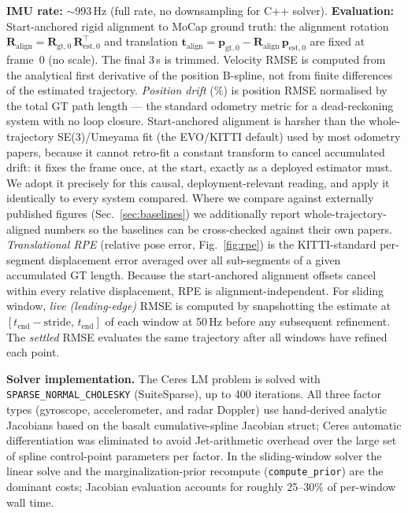 \documentclass[journal]{IEEEtran}
\begin{document}
\textbf{IMU rate:} $\sim$993\,Hz (full rate, no downsampling for C++ solver).
\textbf{Evaluation:} Start-anchored rigid alignment to MoCap ground
truth: the alignment rotation $\mathbf{R}_\mathrm{align} =
\mathbf{R}_{\mathrm{gt},0}\,\mathbf{R}_{\mathrm{est},0}^\top$
and translation $\mathbf{t}_\mathrm{align} =
\mathbf{p}_{\mathrm{gt},0} - \mathbf{R}_\mathrm{align}\,
\mathbf{p}_{\mathrm{est},0}$ are fixed at frame~0 (no scale).
The final 3\,s is trimmed.  Velocity RMSE is computed from the
analytical first derivative of the position B-spline, not from finite
differences of the estimated trajectory.
\emph{Position drift} (\%) is position RMSE normalised by the total
GT path length --- the standard odometry metric for a
dead-reckoning system with no loop closure.
Start-anchored alignment is harsher than the whole-trajectory
SE(3)/Umeyama fit (the EVO/KITTI default) used by most odometry papers,
because it cannot retro-fit a constant transform to cancel accumulated
drift: it fixes the frame once, at the start, exactly as a deployed
estimator must.  We adopt it precisely for this causal,
deployment-relevant reading, and apply it identically to every system
compared.  Where we compare against externally published figures
(Sec.~\ref{sec:baselines}) we additionally report whole-trajectory-aligned
numbers so the baselines can be cross-checked against their own papers.
\emph{Translational RPE} (relative pose error, Fig.~\ref{fig:rpe}) is
the KITTI-standard per-segment displacement error averaged over all
sub-segments of a given accumulated GT length.
Because the start-anchored alignment offsets cancel within every
relative displacement, RPE is alignment-independent.
For sliding window, \emph{live (leading-edge)} RMSE is computed by
snapshotting the estimate at $[t_\text{end}{-}\text{stride},\, t_\text{end}]$
of each window at 50\,Hz before any subsequent refinement.  The
\emph{settled} RMSE evaluates the same trajectory after all windows
have refined each point.

\textbf{Solver implementation.}
The Ceres LM problem is solved with \texttt{SPARSE\_NORMAL\_CHOLESKY}
(SuiteSparse), up to 400 iterations.
All three factor types (gyroscope, accelerometer, and radar Doppler)
use hand-derived analytic Jacobians based on the basalt
cumulative-spline Jacobian struct; Ceres automatic differentiation was
eliminated to avoid Jet-arithmetic overhead over the large set of
spline control-point parameters per factor.
In the sliding-window solver the linear solve and the
marginalization-prior recompute (\texttt{compute\_prior}) are the
dominant costs; Jacobian evaluation accounts for roughly 25--30\% of
per-window wall time.
\end{document}
